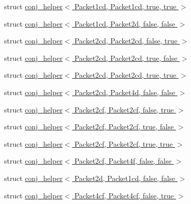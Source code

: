 \begin{DoxyCompactItemize}
\item 
struct \hyperlink{struct_eigen_1_1internal_1_1conj__helper_3_01_packet1cd_00_01_packet1cd_00_01true_00_01true_01_4}{conj\+\_\+helper$<$ Packet1cd, Packet1cd, true, true $>$}
\item 
struct \hyperlink{struct_eigen_1_1internal_1_1conj__helper_3_01_packet1cd_00_01_packet2d_00_01false_00_01false_01_4}{conj\+\_\+helper$<$ Packet1cd, Packet2d, false, false $>$}
\item 
struct \hyperlink{struct_eigen_1_1internal_1_1conj__helper_3_01_packet2cd_00_01_packet2cd_00_01false_00_01true_01_4}{conj\+\_\+helper$<$ Packet2cd, Packet2cd, false, true $>$}
\item 
struct \hyperlink{struct_eigen_1_1internal_1_1conj__helper_3_01_packet2cd_00_01_packet2cd_00_01true_00_01false_01_4}{conj\+\_\+helper$<$ Packet2cd, Packet2cd, true, false $>$}
\item 
struct \hyperlink{struct_eigen_1_1internal_1_1conj__helper_3_01_packet2cd_00_01_packet2cd_00_01true_00_01true_01_4}{conj\+\_\+helper$<$ Packet2cd, Packet2cd, true, true $>$}
\item 
struct \hyperlink{struct_eigen_1_1internal_1_1conj__helper_3_01_packet2cd_00_01_packet4d_00_01false_00_01false_01_4}{conj\+\_\+helper$<$ Packet2cd, Packet4d, false, false $>$}
\item 
struct \hyperlink{struct_eigen_1_1internal_1_1conj__helper_3_01_packet2cf_00_01_packet2cf_00_01false_00_01true_01_4}{conj\+\_\+helper$<$ Packet2cf, Packet2cf, false, true $>$}
\item 
struct \hyperlink{struct_eigen_1_1internal_1_1conj__helper_3_01_packet2cf_00_01_packet2cf_00_01true_00_01false_01_4}{conj\+\_\+helper$<$ Packet2cf, Packet2cf, true, false $>$}
\item 
struct \hyperlink{struct_eigen_1_1internal_1_1conj__helper_3_01_packet2cf_00_01_packet2cf_00_01true_00_01true_01_4}{conj\+\_\+helper$<$ Packet2cf, Packet2cf, true, true $>$}
\item 
struct \hyperlink{struct_eigen_1_1internal_1_1conj__helper_3_01_packet2cf_00_01_packet4f_00_01false_00_01false_01_4}{conj\+\_\+helper$<$ Packet2cf, Packet4f, false, false $>$}
\item 
struct \hyperlink{struct_eigen_1_1internal_1_1conj__helper_3_01_packet2d_00_01_packet1cd_00_01false_00_01false_01_4}{conj\+\_\+helper$<$ Packet2d, Packet1cd, false, false $>$}
\item 
struct \hyperlink{struct_eigen_1_1internal_1_1conj__helper_3_01_packet4cf_00_01_packet4cf_00_01false_00_01true_01_4}{conj\+\_\+helper$<$ Packet4cf, Packet4cf, false, true $>$}

\end{DoxyCompactItemize}

